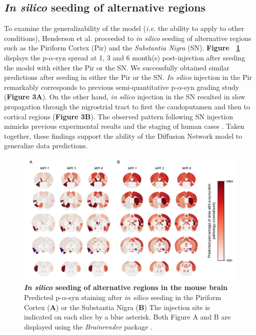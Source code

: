 \subsection{\textit{In silico} seeding of alternative regions}
To examine the generalizability of the model (\textit{i.e.} the ability to apply to other conditions), Henderson et al. proceeded to \textit{in silico} seeding of alternative regions such as the Piriform Cortex (Pir) and the \textit{Substantia Nigra} (SN). \textbf{Figure ~\ref{fig:fig3}} displays the p-$\alpha$-syn spread at 1, 3 and 6 month(s) post-injection after seeding the model with either the Pir or the SN. We successfully obtained similar predictions after seeding in either the Pir or the SN. \textit{In silico} injection in the Pir remarkably corresponds to previous semi-quantitative p-$\alpha$-syn grading study \cite{Rey_2016} (\textbf{Figure 3A}). On the other hand, \textit{in silico} injection in the SN resulted in slow propagation through the nigrostrial tract to first the caudoputamen and then to cortical regions (\textbf{Figure 3B}). The observed pattern following SN injection mimicks previous experimental results and the staging of human cases \cite{Braak_2003, Recasens_2014,  Bourdenx_2020}. Taken together, these findings support the ability of the Diffusion Network model to generalize data predictions.

\begin{figure}[!h]
    \includegraphics[width=\linewidth]{Figures/Fig3.pdf}

    \caption{\textbf{\textit{In silico} seeding of alternative regions in the mouse brain} 
    Predicted p-$\alpha$-syn staining after \textit{in silico} seeding in the Piriform Cortex (\textbf{A}) or the Substantia Nigra (\textbf{B}) The injection site is indicated on each slice by a blue asterisk. Both Figure A and B are displayed using the \textit{Brainrender} package \cite{Claudi_2021}.}
    \label{fig:fig3}
\end{figure}
    
